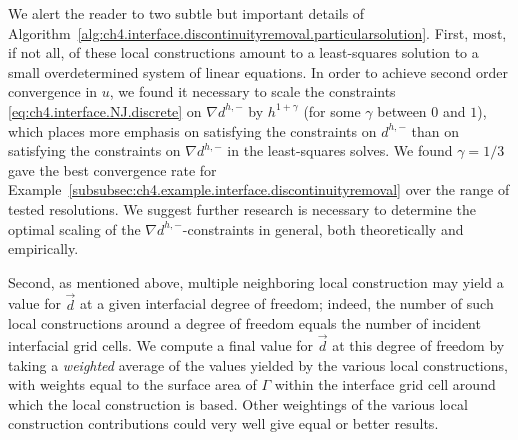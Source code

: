 We alert the reader to two subtle but important details of Algorithm~\ref{alg:ch4.interface.discontinuityremoval.particularsolution}. First, most, if not all, of these local constructions amount to a least-squares solution to a small overdetermined system of linear equations. In order to achieve second order convergence in $u$, we found it necessary to scale the constraints \eqref{eq:ch4.interface.NJ.discrete} on $\nabla d^{h,-}$ by $h^{1+\gamma}$ (for some $\gamma$ between $0$ and $1$), which places more emphasis on satisfying the constraints on $d^{h,-}$ than on satisfying the constraints on $\nabla d^{h,-}$ in the least-squares solves. We found $\gamma = 1/3$ gave the best convergence rate for Example~\ref{subsubsec:ch4.example.interface.discontinuityremoval} over the range of tested resolutions. We suggest further research is necessary to determine the optimal scaling of the $\nabla d^{h,-}$-constraints in general, both theoretically and empirically.

Second, as mentioned above, multiple neighboring local construction may yield a value for $\vec{d}$ at a given interfacial degree of freedom; indeed, the number of such local constructions around a degree of freedom equals the number of incident interfacial grid cells. We compute a final value for $\vec{d}$ at this degree of freedom by taking a \emph{weighted} average of the values yielded by the various local constructions, with weights equal to the surface area of $\Gamma$ within the interface grid cell around which the local construction is based. Other weightings of the various local construction contributions could very well give equal or better results.

